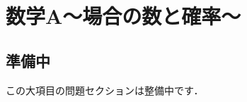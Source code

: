 \documentclass[../../../ms_q.tex]{subfiles}
\begin{document}
\section{数学A～場合の数と確率～}

\subsection*{準備中}
この大項目の問題セクションは整備中です．
\end{document}
